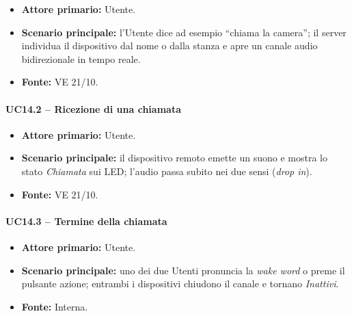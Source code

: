 \documentclass[12pt,a4paper]{article}
\newcommand{\tightlist}{\setlength{\itemsep}{1pt}\setlength{\parskip}{0pt}}
\begin{document}
\begin{itemize}

\tightlist

\item \textbf{Attore primario:} Utente.

\item \textbf{Scenario principale:} l'Utente dice ad esempio ``chiama la camera''; il server individua il dispositivo dal nome o dalla stanza e apre un canale audio bidirezionale in tempo reale.

\item \textbf{Fonte:} VE 21/10.

\end{itemize}



\paragraph{UC14.2 -- Ricezione di una chiamata}

\begin{itemize}

\tightlist

\item \textbf{Attore primario:} Utente. 

\item \textbf{Scenario principale:} il dispositivo remoto emette un suono e mostra lo stato \emph{Chiamata} sui LED; l'audio passa subito nei due sensi (\emph{drop in}).

\item \textbf{Fonte:} VE 21/10.

\end{itemize}



\paragraph{UC14.3 -- Termine della chiamata}

\begin{itemize}

\tightlist

\item \textbf{Attore primario:} Utente.

\item \textbf{Scenario principale:} uno dei due Utenti pronuncia la \emph{wake word} o preme il pulsante azione; entrambi i dispositivi chiudono il canale e tornano \emph{Inattivi}.

\item \textbf{Fonte:} Interna.

\end{itemize}
\end{document}

